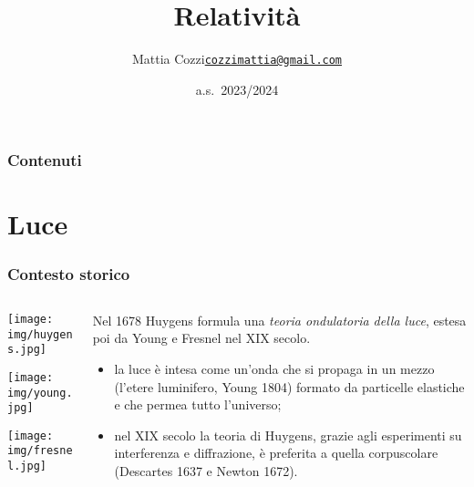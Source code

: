 \documentclass[]{beamer}
\title{Relatività}
\author{\texorpdfstring{Mattia Cozzi\newline\href{mailto:cozzimattia@gmail.com}{\texttt{cozzimattia@gmail.com}}}{Mattia Cozzi}}
\date{a.s.~2023/2024}
\theoremstyle{plain}
\begin{document}
\begin{frame}
  \titlepage
\end{frame}





\begin{frame}
\frametitle{Contenuti}
\tableofcontents
\end{frame}


\section{Luce}



\begin{frame}
\frametitle{Contesto storico}
\begin{columns}
\begin{column}{0.2\textwidth}
\texttt{[image: img/huygens.jpg]}

\texttt{[image: img/young.jpg]}

\texttt{[image: img/fresnel.jpg]}
\end{column}
\begin{column}{0.7\textwidth}
Nel 1678 \alert<1>{Huygens} formula una \emph{teoria ondulatoria della luce}, estesa poi da \alert<1>{Young} e \alert<1>{Fresnel} nel XIX secolo.\pause

\begin{small}
\begin{itemize}
\item<2-> la luce è intesa come un'onda che si propaga in un mezzo (l'\alert<2>{etere luminifero}, Young 1804) formato da particelle elastiche e che permea tutto l'universo;
\item<3-> nel XIX secolo la teoria di Huygens, grazie agli esperimenti su \alert<3>{interferenza} e \alert<3>{diffrazione}, è preferita a quella corpuscolare (Descartes 1637 e Newton 1672).
\end{itemize}
\end{small}
\end{column}
\end{columns}
\end{frame}
\end{document}
